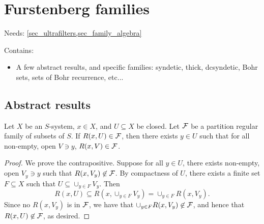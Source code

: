 
\section{Furstenberg families}
\label{sec_furstenberg_families}

Needs: \cref{sec_ultrafilters,sec_family_algebra}

Contains:
\begin{itemize}
    \item A few abstract results, and specific families: syndetic, thick, dcsyndetic, Bohr sets, sets of Bohr recurrence, etc...
\end{itemize}

\subsection{Abstract results}

\begin{lemma}
\label{lemma_pr_family_concentration}
\leanok{}
    Let $X$ be an $S$-system, $x \in X$, and $U \subseteq X$ be closed.  Let $\mathcal{F}$ be a partition regular family of subsets of $S$. If $R(x,U) \in \mathcal{F}$, then there exists $y \in U$ such that for all non-empty, open $V \ni y$, $R(x,V) \in \mathcal{F}$.
\end{lemma}

\begin{proof}
    We prove the contrapositive.  Suppose for all $y \in U$, there exists non-empty, open $V_y \ni y$ such that $R(x,V_y) \not\in \mathcal{F}$.  By compactness of $U$, there exists a finite set $F \subseteq X$ such that $U \subseteq \cup_{y \in F} V_y$. Then
    \[R(x,U) \subseteq R(x,\cup_{y \in F} V_y) = \cup_{y \in F} R(x,V_y).\]
    Since no $R(x,V_y)$ is in $\mathcal{F}$, we have that $\cup_{y \in F} R(x,V_y) \not\in \mathcal{F}$, and hence that $R(x,U) \not\in \mathcal{F}$, as desired.
\end{proof}



